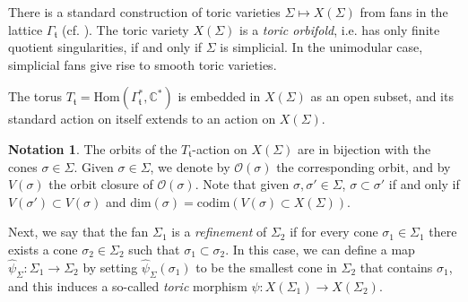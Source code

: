 \documentclass[11pt]{article}
\theoremstyle{definition}
\newtheorem{nota}[theo]{Notation}
\numberwithin{equation}{section}
\begin{document}
There is a standard construction of toric varieties $\Sigma\mapsto X(\Sigma)$ 
from fans in the lattice $\Gamma_\mathfrak{t}$ (cf.  \cite[\S1.4]{Fulton}). The 
toric variety $X(\Sigma)$ is a \textit{toric orbifold}, i.e.  has only finite 
quotient singularities, if and only if $\Sigma$ is simplicial. In the 
unimodular case, simplicial fans give rise to smooth toric varieties. 


The torus $T_{\mathfrak{t}} = \mathrm{Hom}(\Gamma_\mathfrak{t}^*, 
\mathbb{C}^*)$ is embedded in $X(\Sigma)$ as an open subset, and its 
standard action on itself extends to an action on $X(\Sigma)$.




\begin{nota}\label{notation:toricorb}
The orbits of the $T_{\mathfrak{t}}$-action on 
$X(\Sigma)$ are in bijection with the cones $\sigma\in\Sigma$. Given 
$\sigma\in\Sigma$, we denote by $\mathcal{O}(\sigma)$ the corresponding orbit, 
and by $V(\sigma)$ the orbit closure of $\mathcal{O}(\sigma)$. Note that given $\sigma, \sigma'\in\Sigma$, 
$\sigma\subset\sigma'$ if and only if $V({\sigma'})\subset V(\sigma)$ and 
$\mathrm{dim}(\sigma)=\mathrm{codim}(V(\sigma)\subset X(\Sigma))$. 
\end{nota}



Next, we say that the fan $\Sigma_1$ is a \textit{refinement} of $\Sigma_2$ if for every cone $\sigma_1\in\Sigma_1$ there exists a cone $\sigma_2\in\Sigma_2$ such that $\sigma_1 \subset \sigma_2$. In this case, we can define a map $\widehat{\psi}_\Sigma: \Sigma_1\to \Sigma_2$ by setting $\widehat{\psi}_\Sigma(\sigma_1)$ to be the smallest cone in $\Sigma_2$ that contains $\sigma_1$, and this induces a so-called  \textit{toric} morphism $\psi: X(\Sigma_1) \to X(\Sigma_2)$.
\end{document}
